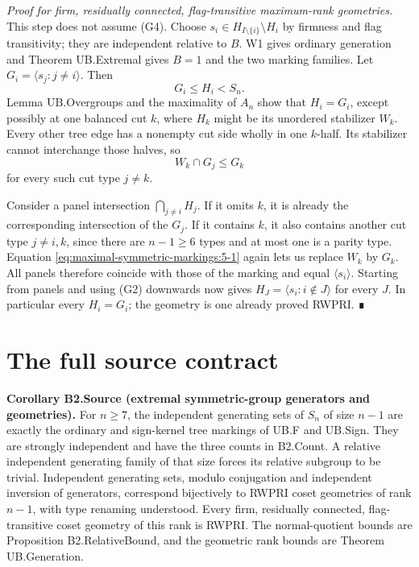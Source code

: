\emph{Proof for firm, residually connected, flag-transitive maximum-rank geometries.} This step does not assume (G4). Choose \(s_i\in H_{I\setminus\{i\}}\setminus H_i\) by firmness and flag transitivity; they are independent relative to \(B\). W1 gives ordinary generation and Theorem UB.Extremal gives \(B=1\) and the two marking families. Let \(G_i=\langle s_j:j\ne i\rangle\). Then \[
G_i\leq H_i<S_n.
\] Lemma UB.Overgroups and the maximality of \(A_n\) show that \(H_i=G_i\), except possibly at one balanced cut \(k\), where \(H_k\) might be its unordered stabilizer \(W_k\). Every other tree edge has a nonempty cut side wholly in one \(k\)-half. Its stabilizer cannot interchange those halves, so \begin{equation}
W_k\cap G_j\leq G_k
\label{eq:maximal-symmetric-markings:5-1}
\end{equation} for every such cut type \(j\ne k\).

Consider a panel intersection \(\bigcap_{j\ne i}H_j\). If it omits \(k\), it is already the corresponding intersection of the \(G_j\). If it contains \(k\), it also contains another cut type \(j\ne i,k\), since there are \(n-1\geq6\) types and at most one is a parity type. Equation \eqref{eq:maximal-symmetric-markings:5-1} again lets us replace \(W_k\) by \(G_k\). All panels therefore coincide with those of the marking and equal \(\langle s_i\rangle\). Starting from panels and using (G2) downwards now gives \(H_J=\langle s_i:i\notin J\rangle\) for every \(J\). In particular every \(H_i=G_i\); the geometry is one already proved RWPRI. ∎
\section{The full source contract}
\textbf{Corollary B2.Source (extremal symmetric-group generators and geometries).} For \(n\geq7\), the independent generating sets of \(S_n\) of size \(n-1\) are exactly the ordinary and sign-kernel tree markings of UB.F and UB.Sign. They are strongly independent and have the three counts in B2.Count. A relative independent generating family of that size forces its relative subgroup to be trivial. Independent generating sets, modulo conjugation and independent inversion of generators, correspond bijectively to RWPRI coset geometries of rank \(n-1\), with type renaming understood. Every firm, residually connected, flag-transitive coset geometry of this rank is RWPRI. The normal-quotient bounds are Proposition B2.RelativeBound, and the geometric rank bounds are Theorem UB.Generation.

